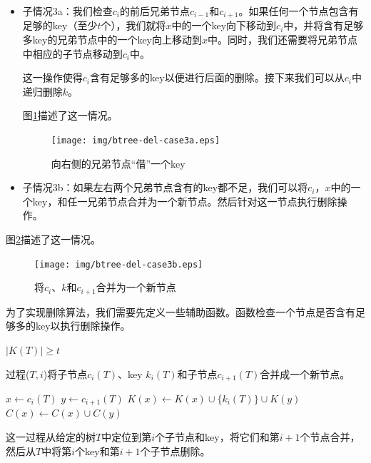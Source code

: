 \documentclass{ctexart}
\begin{document}
\begin{itemize}
\item 子情况3a：我们检查$c_i$的前后兄弟节点$c_{i-1}$和$c_{i+1}$。如果任何一个节点包含有足够的key（至少$t$个），我们就将$x$中的一个key向下移动到$c_i$中，并将含有足够多key的兄弟节点中的一个key向上移动到$x$中。同时，我们还需要将兄弟节点中相应的子节点移动到$c_i$中。

这一操作使得$c_i$含有足够多的key以便进行后面的删除。接下来我们可以从$c_i$中递归删除$k$。

图\ref{fig:btree-del-case3a}描述了这一情况。

\begin{figure}[htbp]
  \centering
    \texttt{[image: img/btree-del-case3a.eps]}
    \caption{向右侧的兄弟节点“借”一个key}
    \label{fig:btree-del-case3a}
\end{figure}

\item 子情况3b：如果左右两个兄弟节点含有的key都不足，我们可以将$c_i$，$x$中的一个key，和任一兄弟节点合并为一个新节点。然后针对这一节点执行删除操作。
\end{itemize}

图\ref{fig:btree-del-case3b}描述了这一情况。

\begin{figure}[htbp]
  \centering
    \texttt{[image: img/btree-del-case3b.eps]}
    \caption{将$c_i$、$k$和$c_{i+1}$合并为一个新节点}
    \label{fig:btree-del-case3b}
\end{figure}

为了实现删除算法，我们需要先定义一些辅助函数。函数检查一个节点是否含有足够多的key以执行删除操作。

\begin{algorithmic}[1]
  \State \Return $|K(T)| \ge t$
\EndFunction
\end{algorithmic}

过程($T, i$)将子节点$c_i(T)$、key $k_i(T)$和子节点$c_{i+1}(T)$合并成一个新节点。

\begin{algorithmic}[1]
 
  \State $x \gets c_i(T)$
  \State $y \gets c_{i+1}(T)$
  \State $K(x) \gets K(x) \cup \{k_i(T)\} \cup K(y)$
  \State $C(x) \gets C(x) \cup C(y)$
  \State {}
  \State {}
\EndProcedure
\end{algorithmic}

这一过程从给定的树$T$中定位到第$i$个子节点和key，将它们和第$i+1$个节点合并，然后从$T$中将第$i$个key和第$i+1$个子节点删除。
\end{document}
